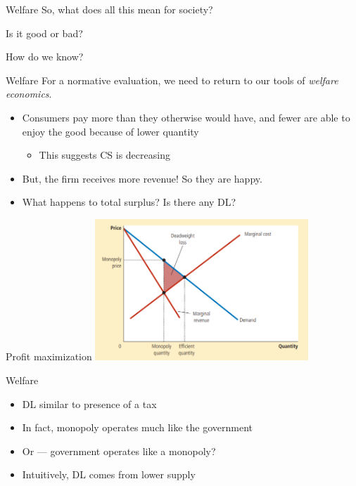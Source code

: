 \documentclass[aspectratio=169]{beamer}
\begin{document}
\begin{frame}{Welfare}
    So, what does all this mean for society?

    \vspace{2mm}

    Is it good or bad? 

    \vspace{2mm}

    How do we know?
\end{frame}

\begin{frame}{Welfare}
    For a normative evaluation, we need to return to our tools of \textit{welfare economics}.

    \begin{itemize}
        \item Consumers pay more than they otherwise would have, and fewer are able to enjoy the good because of lower quantity
        \begin{itemize}
            \item This suggests CS is decreasing
        \end{itemize}
        \item But, the firm receives more revenue! So they are happy.
        \item What happens to total surplus? Is there any DL?
    \end{itemize}
\end{frame}

\begin{frame}{Profit maximization}
    \centering
    \includegraphics[width = 0.6\textwidth,keepaspectratio]{../figs/DL.png}
\end{frame}

\begin{frame}{Welfare}
    \begin{itemize}
        \item DL similar to presence of a tax
        \item In fact, monopoly operates much like the government
        \item Or --- government operates like a monopoly?
        \item Intuitively, DL comes from lower supply
    \end{itemize}
\end{frame}
\end{document}
